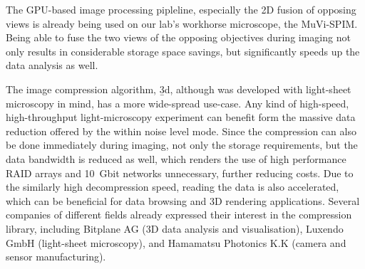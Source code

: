   The GPU-based image processing pipleline, especially the 2D fusion of opposing views is already being used on our lab's workhorse microscope, the MuVi-SPIM. Being able to fuse the two views of the opposing objectives during imaging not only results in considerable storage space savings, but significantly speeds up the data analysis as well.

  The image compression algorithm, \b3d, although was developed with light-sheet microscopy in mind, has a more wide-spread use-case. Any kind of high-speed, high-throughput light-microscopy experiment can benefit form the massive data reduction offered by the within noise level mode. Since the compression can also be done immediately during imaging, not only the storage requirements, but the data bandwidth is reduced as well, which renders the use of high performance RAID arrays and \SI{10}{Gbit} networks unnecessary, further reducing costs.
  Due to the similarly high decompression speed, reading the data is also accelerated, which can be beneficial for data browsing and 3D rendering applications. Several companies of different fields already expressed their interest in the compression library, including Bitplane AG (3D data analysis and visualisation), Luxendo GmbH (light-sheet microscopy), and Hamamatsu Photonics K.K (camera and sensor manufacturing).


